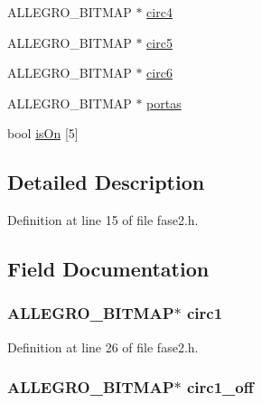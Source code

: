 \begin{DoxyCompactItemize}
A\-L\-L\-E\-G\-R\-O\-\_\-\-B\-I\-T\-M\-A\-P $\ast$ \hyperlink{struct_level_dois_a1adf43c25b4c9b87aeb45c1e4bd24d4f}{circ4}
\item 
A\-L\-L\-E\-G\-R\-O\-\_\-\-B\-I\-T\-M\-A\-P $\ast$ \hyperlink{struct_level_dois_a6444f15bb917b382f7e91576f46c2706}{circ5}
\item 
A\-L\-L\-E\-G\-R\-O\-\_\-\-B\-I\-T\-M\-A\-P $\ast$ \hyperlink{struct_level_dois_a727b47ddfdf73dd07d1a2832fc0f24f9}{circ6}
\item 
A\-L\-L\-E\-G\-R\-O\-\_\-\-B\-I\-T\-M\-A\-P $\ast$ \hyperlink{struct_level_dois_a6c47128335a6e9846fb9576bace5a597}{portas}
\item 
bool \hyperlink{struct_level_dois_a59f6fe985ed5513f62660b2926c812aa}{is\-On} \mbox{[}5\mbox{]}
\end{DoxyCompactItemize}


\subsection{Detailed Description}


Definition at line 15 of file fase2.\-h.



\subsection{Field Documentation}
\hypertarget{struct_level_dois_a9877f31790b6d2f38fb468a9448223f1}{
\subsubsection[{circ1}]{\setlength{\rightskip}{0pt plus 5cm}A\-L\-L\-E\-G\-R\-O\-\_\-\-B\-I\-T\-M\-A\-P$\ast$ circ1}}\label{struct_level_dois_a9877f31790b6d2f38fb468a9448223f1}


Definition at line 26 of file fase2.\-h.

\hypertarget{struct_level_dois_a61973bafd11ab9dea9306731297f4728}{
\subsubsection[{circ1\-\_\-off}]{\setlength{\rightskip}{0pt plus 5cm}A\-L\-L\-E\-G\-R\-O\-\_\-\-B\-I\-T\-M\-A\-P$\ast$ circ1\-\_\-off}}\label{struct_level_dois_a61973bafd11ab9dea9306731297f4728}


